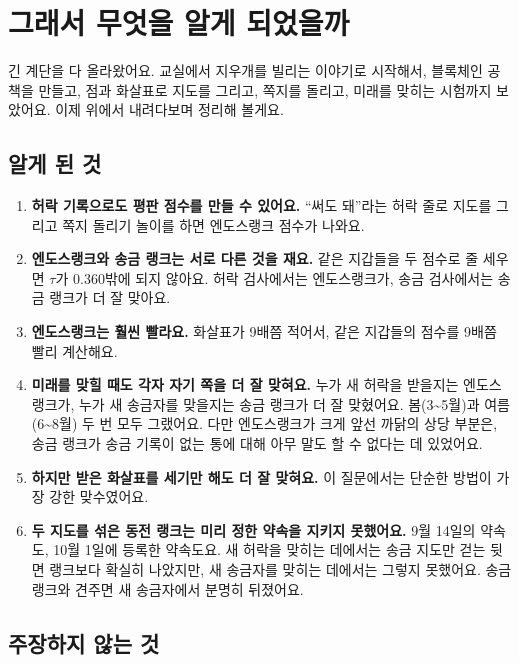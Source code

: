 \chapter{그래서 무엇을 알게 되었을까}

긴 계단을 다 올라왔어요.
교실에서 지우개를 빌리는 이야기로 시작해서, 블록체인 공책을 만들고,
점과 화살표로 지도를 그리고, 쪽지를 돌리고, 미래를 맞히는 시험까지 보았어요.
이제 위에서 내려다보며 정리해 볼게요.

\section{알게 된 것}

\begin{enumerate}
\item \textbf{허락 기록으로도 평판 점수를 만들 수 있어요.}
      “써도 돼”라는 허락 줄로 지도를 그리고 쪽지 돌리기 놀이를 하면 엔도스랭크 점수가 나와요.
\item \textbf{엔도스랭크와 송금 랭크는 서로 다른 것을 재요.}
      같은 지갑들을 두 점수로 줄 세우면 $\tau$가 0.360밖에 되지 않아요.
      허락 검사에서는 엔도스랭크가, 송금 검사에서는 송금 랭크가 더 잘 맞아요.
\item \textbf{엔도스랭크는 훨씬 빨라요.}
      화살표가 9배쯤 적어서, 같은 지갑들의 점수를 9배쯤 빨리 계산해요.
\item \textbf{미래를 맞힐 때도 각자 자기 쪽을 더 잘 맞혀요.}
      누가 새 허락을 받을지는 엔도스랭크가, 누가 새 송금자를 맞을지는 송금 랭크가 더 잘 맞혔어요.
      봄(3\textasciitilde{}5월)과 여름(6\textasciitilde{}8월) 두 번 모두 그랬어요.
      다만 엔도스랭크가 크게 앞선 까닭의 상당 부분은, 송금 랭크가 송금 기록이 없는 통에 대해 아무 말도 할 수 없다는 데 있었어요.
\item \textbf{하지만 받은 화살표를 세기만 해도 더 잘 맞혀요.}
      이 질문에서는 단순한 방법이 가장 강한 맞수였어요.
\item \textbf{두 지도를 섞은 동전 랭크는 미리 정한 약속을 지키지 못했어요.}
      9월 14일의 약속도, 10월 1일에 등록한 약속도요.
      새 허락을 맞히는 데에서는 송금 지도만 걷는 뒷면 랭크보다 확실히 나았지만, 새 송금자를 맞히는 데에서는 그렇지 못했어요.
      송금 랭크와 견주면 새 송금자에서 분명히 뒤졌어요.
\end{enumerate}

\section{주장하지 않는 것}

